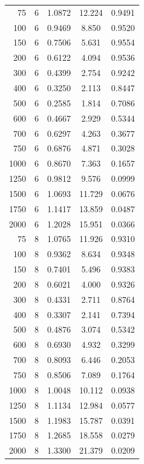 \begin{longtable}{rrccc}
75 & 6 & 1.0872 & 12.224 & 0.9491 \\
100 & 6 & 0.9469 & 8.850 & 0.9520 \\
150 & 6 & 0.7506 & 5.631 & 0.9554 \\
200 & 6 & 0.6122 & 4.094 & 0.9536 \\
300 & 6 & 0.4399 & 2.754 & 0.9242 \\
400 & 6 & 0.3250 & 2.113 & 0.8447 \\
500 & 6 & 0.2585 & 1.814 & 0.7086 \\
600 & 6 & 0.4667 & 2.929 & 0.5344 \\
700 & 6 & 0.6297 & 4.263 & 0.3677 \\
750 & 6 & 0.6876 & 4.871 & 0.3028 \\
1000 & 6 & 0.8670 & 7.363 & 0.1657 \\
1250 & 6 & 0.9812 & 9.576 & 0.0999 \\
1500 & 6 & 1.0693 & 11.729 & 0.0676 \\
1750 & 6 & 1.1417 & 13.859 & 0.0487 \\
2000 & 6 & 1.2028 & 15.951 & 0.0366 \\
75 & 8 & 1.0765 & 11.926 & 0.9310 \\
100 & 8 & 0.9362 & 8.634 & 0.9348 \\
150 & 8 & 0.7401 & 5.496 & 0.9383 \\
200 & 8 & 0.6021 & 4.000 & 0.9326 \\
300 & 8 & 0.4331 & 2.711 & 0.8764 \\
400 & 8 & 0.3307 & 2.141 & 0.7394 \\
500 & 8 & 0.4876 & 3.074 & 0.5342 \\
600 & 8 & 0.6930 & 4.932 & 0.3299 \\
700 & 8 & 0.8093 & 6.446 & 0.2053 \\
750 & 8 & 0.8506 & 7.089 & 0.1764 \\
1000 & 8 & 1.0048 & 10.112 & 0.0938 \\
1250 & 8 & 1.1134 & 12.984 & 0.0577 \\
1500 & 8 & 1.1983 & 15.787 & 0.0391 \\
1750 & 8 & 1.2685 & 18.558 & 0.0279 \\
2000 & 8 & 1.3300 & 21.379 & 0.0209 \\
\bottomrule
\end{longtable}